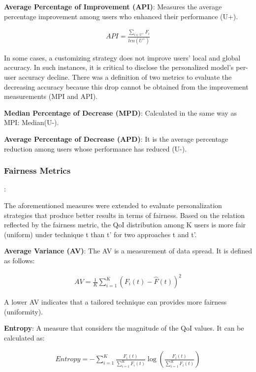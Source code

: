 \textbf{Average Percentage of Improvement (API)}: Measures the average percentage improvement among users who enhanced their performance (U+).

\begin{equation} \label{eq3}
\begin{split}
API = \frac{\sum_{i \in U^{+}}{F_i}}{len(U^{+})}
\end{split}
\end{equation}

In some cases, a customizing strategy does not improve users' local and global accuracy. In such instances, it is critical to disclose the personalized model's per-user accuracy decline. There was a definition of two metrics to evaluate the decreasing accuracy because this drop cannot be obtained from the improvement measurements (MPI and API).

\textbf{Median Percentage of Decrease (MPD)}: Calculated in the same way as MPI: Median(U-).

\textbf{Average Percentage of Decrease (APD)}: It is the average percentage reduction among users whose performance has reduced (U-).

\subsubsection{Fairness Metrics}: 

The aforementioned measures were extended to evaluate personalization strategies that produce better results in terms of fairness. Based on the relation reflected by the fairness metric, the QoI distribution among K users is more fair (uniform) under technique t than t' for two approaches t and t'.

\textbf{Average Variance (AV)}: The AV is a measurement of data spread. It is defined as follows:

\begin{equation} \label{eq4}
\begin{split}
AV = \frac{1}{K}\sum_{i =1}^{K}{(F_i(t) - \hat{F}(t))^2}
\end{split}
\end{equation}

A lower AV indicates that a tailored technique can provides more fairness (uniformity).

\textbf{Entropy}: A measure that considers the magnitude of the QoI values. It can be calculated as:

\begin{equation} \label{eq5}
\begin{split}
Entropy = -\sum_{i=1}^{K}{\frac{F_i(t)}{\sum_{i=1}^{K}{F_i(t)}} \log\left(\frac{F_i(t)}{\sum_{i=1}^{K}{F_i(t)}}\right)}
\end{split}
\end{equation}

